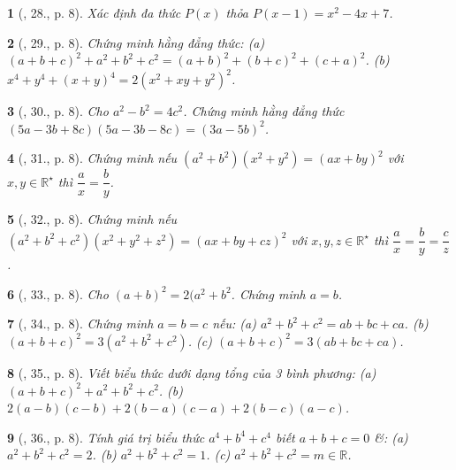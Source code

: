 \documentclass{article}
\newtheorem{baitoan}{}
\begin{document}
\begin{baitoan}[\cite{Binh_Toan_8_tap_1}, 28., p. 8]
	Xác định đa thức $P(x)$ thỏa $P(x - 1) = x^2 - 4x + 7$.
\end{baitoan}

\begin{baitoan}[\cite{Binh_Toan_8_tap_1}, 29., p. 8]
	Chứng minh hằng đẳng thức: (a) $(a + b + c)^2 + a^2 + b^2 + c^2 = (a + b)^2 + (b + c)^2 + (c + a)^2$. (b) $x^4 + y^4 + (x + y)^4 = 2(x^2 + xy + y^2)^2$.
\end{baitoan}

\begin{baitoan}[\cite{Binh_Toan_8_tap_1}, 30., p. 8]
	Cho $a^2 - b^2 = 4c^2$. Chứng minh hằng đẳng thức $(5a - 3b + 8c)(5a - 3b - 8c) = (3a - 5b)^2$.
\end{baitoan}

\begin{baitoan}[\cite{Binh_Toan_8_tap_1}, 31., p. 8]
	Chứng minh nếu $(a^2 + b^2)(x^2 + y^2) = (ax + by)^2$ với $x,y\in\mathbb{R}^\star$ thì $\dfrac{a}{x} = \dfrac{b}{y}$.
\end{baitoan}

\begin{baitoan}[\cite{Binh_Toan_8_tap_1}, 32., p. 8]
	Chứng minh nếu $(a^2 + b^2 + c^2)(x^2 + y^2 + z^2) = (ax + by + cz)^2$ với $x,y,z\in\mathbb{R}^\star$ thì $\dfrac{a}{x} = \dfrac{b}{y} = \dfrac{c}{z}$.
\end{baitoan}

\begin{baitoan}[\cite{Binh_Toan_8_tap_1}, 33., p. 8]
	Cho $(a + b)^2 = 2(a^2 + b^2$. Chứng minh $a = b$.
\end{baitoan}

\begin{baitoan}[\cite{Binh_Toan_8_tap_1}, 34., p. 8]
	Chứng minh $a = b = c$ nếu: (a) $a^2 + b^2 + c^2 = ab + bc + ca$. (b) $(a + b + c)^2 = 3(a^2 + b^2 + c^2)$. (c) $(a + b + c)^2 = 3(ab + bc + ca)$.
\end{baitoan}

\begin{baitoan}[\cite{Binh_Toan_8_tap_1}, 35., p. 8]
	Viết biểu thức dưới dạng tổng của 3 bình phương: (a) $(a + b + c)^2 + a^2 + b^2 + c^2$. (b) $2(a - b)(c - b) + 2(b - a)(c - a) + 2(b - c)(a - c)$.
\end{baitoan}

\begin{baitoan}[\cite{Binh_Toan_8_tap_1}, 36., p. 8]
	Tính giá trị biểu thức $a^4 + b^4 + c^4$ biết $a + b + c = 0$ \&: (a) $a^2 + b^2 + c^2 = 2$. (b) $a^2 + b^2 + c^2 = 1$. (c) $a^2 + b^2 + c^2 = m\in\mathbb{R}$.
\end{baitoan}
\end{document}
